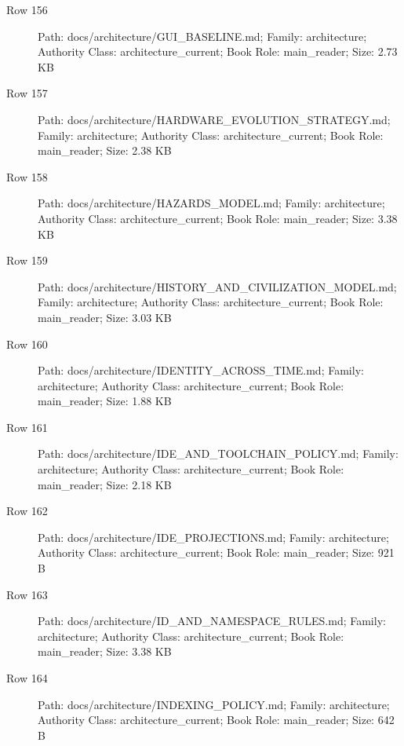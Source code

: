 \documentclass[9pt,a4paper]{book}
\begin{document}
\begin{description}
\item[Row 156] Path: docs/\allowbreak{}architecture/\allowbreak{}GUI\_\allowbreak{}BASELINE.\allowbreak{}md; Family: architecture; Authority Class: architecture\_\allowbreak{}current; Book Role: main\_\allowbreak{}reader; Size: 2.\allowbreak{}73 KB
\item[Row 157] Path: docs/\allowbreak{}architecture/\allowbreak{}HARDWARE\_\allowbreak{}EVOLUTION\_\allowbreak{}STRATEGY.\allowbreak{}md; Family: architecture; Authority Class: architecture\_\allowbreak{}current; Book Role: main\_\allowbreak{}reader; Size: 2.\allowbreak{}38 KB
\item[Row 158] Path: docs/\allowbreak{}architecture/\allowbreak{}HAZARDS\_\allowbreak{}MODEL.\allowbreak{}md; Family: architecture; Authority Class: architecture\_\allowbreak{}current; Book Role: main\_\allowbreak{}reader; Size: 3.\allowbreak{}38 KB
\item[Row 159] Path: docs/\allowbreak{}architecture/\allowbreak{}HISTORY\_\allowbreak{}AND\_\allowbreak{}CIVILIZATION\_\allowbreak{}MODEL.\allowbreak{}md; Family: architecture; Authority Class: architecture\_\allowbreak{}current; Book Role: main\_\allowbreak{}reader; Size: 3.\allowbreak{}03 KB
\item[Row 160] Path: docs/\allowbreak{}architecture/\allowbreak{}IDENTITY\_\allowbreak{}ACROSS\_\allowbreak{}TIME.\allowbreak{}md; Family: architecture; Authority Class: architecture\_\allowbreak{}current; Book Role: main\_\allowbreak{}reader; Size: 1.\allowbreak{}88 KB
\item[Row 161] Path: docs/\allowbreak{}architecture/\allowbreak{}IDE\_\allowbreak{}AND\_\allowbreak{}TOOLCHAIN\_\allowbreak{}POLICY.\allowbreak{}md; Family: architecture; Authority Class: architecture\_\allowbreak{}current; Book Role: main\_\allowbreak{}reader; Size: 2.\allowbreak{}18 KB
\item[Row 162] Path: docs/\allowbreak{}architecture/\allowbreak{}IDE\_\allowbreak{}PROJECTIONS.\allowbreak{}md; Family: architecture; Authority Class: architecture\_\allowbreak{}current; Book Role: main\_\allowbreak{}reader; Size: 921 B
\item[Row 163] Path: docs/\allowbreak{}architecture/\allowbreak{}ID\_\allowbreak{}AND\_\allowbreak{}NAMESPACE\_\allowbreak{}RULES.\allowbreak{}md; Family: architecture; Authority Class: architecture\_\allowbreak{}current; Book Role: main\_\allowbreak{}reader; Size: 3.\allowbreak{}38 KB
\item[Row 164] Path: docs/\allowbreak{}architecture/\allowbreak{}INDEXING\_\allowbreak{}POLICY.\allowbreak{}md; Family: architecture; Authority Class: architecture\_\allowbreak{}current; Book Role: main\_\allowbreak{}reader; Size: 642 B

\end{description}
\end{document}
